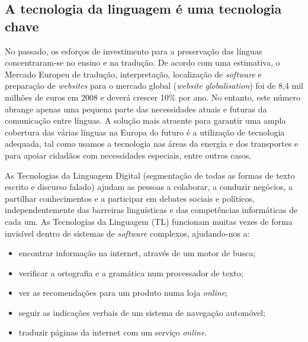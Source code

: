\begin{multicols}{2}

\subsection{A tecnologia da linguagem é uma tecnologia chave}

 No passado, os esforços de investimento para a preservação das línguas concentraram-se no ensino e na tradução. De acordo com uma estimativa, o Mercado Europeu de tradução, interpretação, localização de \textit{software} e preparação de \textit{websites} para o mercado global (\textit{website globalisation}) foi de 8,4 mil milhões de euros em 2008 e deverá crescer 10\% por ano\cite{EC3}. No entanto, este número abrange apenas uma pequena parte das necessidades atuais e futuras da comunicação entre línguas. A solução mais atraente para garantir uma ampla cobertura das várias línguas na Europa do futuro é a utilização de tecnologia adequada, tal como usamos a tecnologia nas áreas da energia e dos transportes e para apoiar cidadãos com necessidades especiais, entre outros casos.


As Tecnologias da Linguagem Digital (segmentação de todas as formas de texto escrito e discurso falado) ajudam as pessoas a colaborar, a conduzir negócios, a partilhar conhecimentos e a participar em debates sociais e políticos, independentemente das barreiras linguísticas e das competências informáticas de cada um. As Tecnologias da Linguagem (TL) funcionam muitas vezes de forma invisível dentro de sistemas de \textit{software} complexos, ajudando-nos a:

\begin{itemize}
  \item encontrar informação na internet, através de um motor de busca;
      \item verificar a ortografia e a gramática num processador de texto;
      \item ver as recomendações para um produto numa loja \textit{online};
      \item seguir as indicações verbais de um sistema de navegação automóvel;
      \item traduzir páginas da internet com um serviço \textit{online}.
\end{itemize}


\end{multicols}
